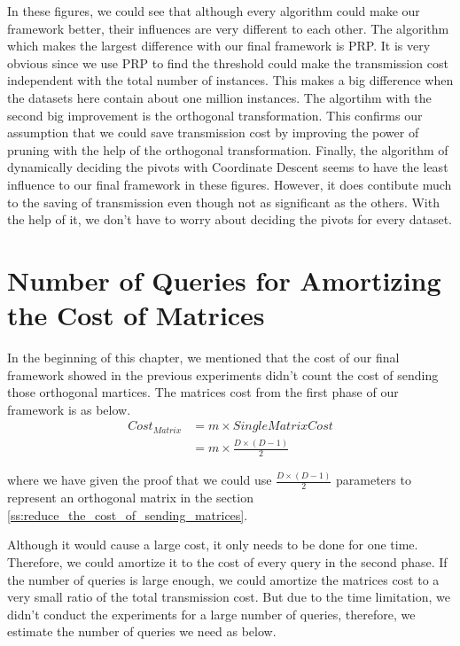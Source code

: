In these figures, we could see that although every algorithm could make our framework better, their influences are very different to each other.  The algorithm which makes the largest difference with our final framework is PRP.  It is very obvious since we use PRP to find the threshold could make the transmission cost independent with the total number of instances.  This makes a big difference when the datasets here contain about one million instances.  The algortihm with the second big improvement is the orthogonal transformation.  This confirms our assumption that we could save transmission cost by improving the power of pruning with the help of the orthogonal transformation.  Finally, the algorithm of dynamically deciding the pivots with Coordinate Descent seems to have the least influence to our final framework in these figures.  However, it does contibute much to the saving of transmission even though not as significant as the others.  With the help of it, we don't have to worry about deciding the pivots for every dataset.


\section{Number of Queries for Amortizing the Cost of Matrices} %
\label{s:number_of_queries_for_amortizing_the_cost_of_matrices}

In the beginning of this chapter, we mentioned that the cost of our final framework showed in the previous experiments didn't count the cost of sending those orthogonal martices.  The matrices cost from the first phase of our framework is as below. 
\begin{equation}
\begin{aligned}
	Cost_{Matrix} & = m\times SingleMatrixCost \\
                  & = m\times \frac{D\times (D-1)}{2}
\end{aligned}
\end{equation}

where we have given the proof that we could use $\frac{D\times (D-1)}{2}$ parameters to represent an orthogonal matrix in the section \ref{ss:reduce_the_cost_of_sending_matrices}.


Although it would cause a large cost, it only needs to be done for one time.  Therefore, we could amortize it to the cost of every query in the second phase.  If the number of queries is large enough, we could amortize the matrices cost to a very small ratio of the total transmission cost.  But due to the time limitation, we didn't conduct the experiments for a large number of queries, therefore, we estimate the number of queries we need as below.

